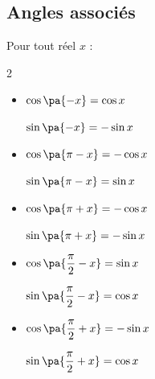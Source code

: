 \subsection{Angles associés}

\begin{prop}
	Pour tout réel $x$ :

	\begin{multicols}{2}
		\begin{itemize}
			\item $\cos\pa{-x} = \cos x$

			      $\sin\pa{-x} = -\sin x$
			\item $\cos\pa{\pi - x} = -\cos x$

			      $\sin\pa{\pi - x} = \sin x$
			\item $\cos\pa{\pi + x} = -\cos x$

			      $\sin\pa{\pi + x} = -\sin x$
			\item $\cos\pa{\dfrac{\pi}{2} - x} = \sin x$

			      $\sin\pa{\dfrac{\pi}{2} - x} = \cos x$
			\item $\cos\pa{\dfrac{\pi}{2} + x} = -\sin x$

			      $\sin\pa{\dfrac{\pi}{2} + x} = \cos x$
		\end{itemize}
	\end{multicols}
\end{prop}

\newpage

